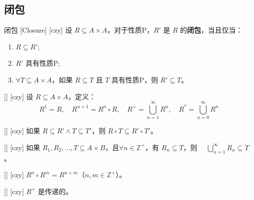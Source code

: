 \documentclass[UTF8]{ctexart}
\begin{document}
    \subsection{闭包}

        \begin{dfn}
            [UUID]
            {闭包}
            [Closure]
            [czy]
            设 \( R \subseteq A \times A \)，对于性质P，\( R' \) 是 \( R \) 的\textbf{闭包}，当且仅当：
            \begin{enumerate}
                \item \( R \subseteq R' \);
                \item \( R' \) 具有性质P;
                \item \(\forall T \subseteq A \times A \)，如果 \( R \subseteq T \) 且 \( T \) 具有性质P，则 \( R' \subseteq T \)。
            \end{enumerate}
        \end{dfn}

        \begin{dfn}
            [UUID]
            {}
            []
            [czy]
            设 \( R \subseteq A \times A \)，定义：
            \[
            R^1 = R, \quad R^{n+1} = R^n \circ R, \quad R^+ = \bigcup_{n=1}^{\infty} R^n, \quad R^* = \bigcup_{n=0}^{\infty} R^n
            \]
        \end{dfn}

        \begin{lma}
            [UUID]
            {}
            []
            [czy]            
                如果 \( R \subseteq R' \land T \subseteq T' \)，则 \( R \circ T \subseteq R' \circ T' \)。
        \end{lma}

        \begin{lma}
            [UUID]
            {}
            []
            [czy]
                如果 \( R_1, R_2, \ldots, T \subseteq A \times B \)，且\(\forall n \in \mathbb{Z}^+ \)，有 \( R_n \subseteq T \)，则 \( \quad \bigcup_{n=1}^{\infty} R_n \subseteq T \)。
        \end{lma}

        \begin{lma}
            [UUID]
            {}
            []
            [czy]
                \( R^n \circ R^m = R^{n+m} \)（\( n, m \in \mathbb{Z}^+ \)）。
        \end{lma}

        \begin{lma}
            [UUID]
            {}
            []
            [czy]
            \( R^+ \) 是传递的。
            \end{lma}
\end{document}
